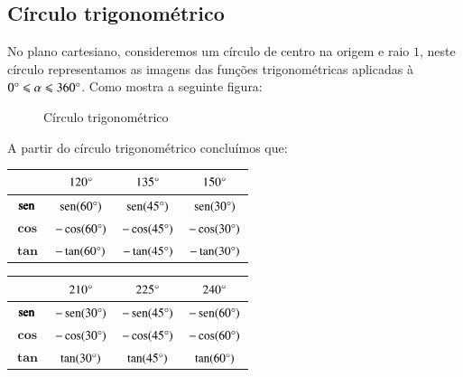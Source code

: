 \subsection{Círculo trigonométrico}

 No plano cartesiano, consideremos um círculo de centro na origem e raio $1$, neste círculo representamos as imagens das funções trigonométricas aplicadas à  $0 \degree \leqslant \alpha \leqslant 360 \degree$. Como mostra a seguinte figura:
 \begin{figure}[H]
   \centering
   \caption{Círculo trigonométrico}
  \end{figure}

  A partir do círculo trigonométrico concluímos que:

  \begin{table}[H]
 \centering
 \begin{tabular}{|c|c|c|c|} \hline
 \rowcolor{cinza}
               &  $120\degree$  & $135\degree$  &  $150\degree$ \\\hline
  $\pmb{\operatorname{sen}}$ & $\operatorname{sen}(60\degree)$ &$\operatorname{sen}(45\degree)$ & $\operatorname{sen}(30\degree)$  \\\hline
  $\pmb{\cos}$ & $-\cos(60\degree)$ &$-\cos(45\degree)$ & $-\cos(30\degree)$  \\\hline
  $\pmb{\tan}$ & $-\tan(60\degree)$ &$-\tan(45\degree)$ & $-\tan(30\degree)$  \\\hline
 \end{tabular}
\end{table}

 \begin{table}[H]
 \centering
 \begin{tabular}{|c|c|c|c|} \hline
 \rowcolor{cinza}
                & $210\degree$ & $225\degree$  & $240\degree$  \\\hline
  $\pmb{\operatorname{sen}}$ &  $-\operatorname{sen}(30\degree)$ & $-\operatorname{sen}(45\degree)$ & $-\operatorname{sen}(60\degree)$  \\\hline
  $\pmb{\cos}$ &  $-\cos(30\degree)$ & $-\cos(45\degree)$ & $-\cos(60\degree)$  \\\hline
  $\pmb{\tan}$ &  $\tan(30\degree)$ & $\tan(45\degree)$ & $\tan(60\degree)$   \\\hline
 \end{tabular}
\end{table}

